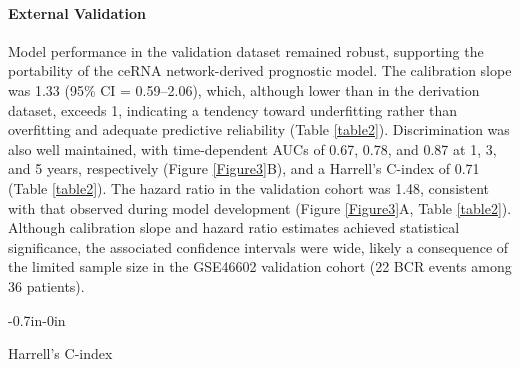 \paragraph{External Validation}
Model performance in the validation dataset remained robust, supporting the portability of the ceRNA network-derived prognostic model. The calibration slope was 1.33 (95\% CI = 0.59–2.06), which, although lower than in the derivation dataset, exceeds 1, indicating a tendency toward underfitting rather than overfitting and adequate predictive reliability (Table \ref{table2}). Discrimination was also well maintained, with time-dependent AUCs of 0.67, 0.78, and 0.87 at 1, 3, and 5 years, respectively (Figure \ref{Figure3}B), and a Harrell’s C-index of 0.71 (Table \ref{table2}). The hazard ratio in the validation cohort was 1.48, consistent with that observed during model development (Figure \ref{Figure3}A, Table \ref{table2}). Although calibration slope and hazard ratio estimates achieved statistical significance, the associated confidence intervals were wide, likely a consequence of the limited sample size in the GSE46602 validation cohort (22 BCR events among 36 patients).


\begin{table}[ht!]
\caption[Evaluation of the prognostic model in the derivation dataset and external validation dataset]{\textbf{Evaluation of the prognostic model in the derivation dataset and external validation dataset}.\label{table2}}
\begin{adjustwidth}{-0.7in}{-0in}
\tabcolsep=0pt%
\footnotesize
{}
\end{adjustwidth}
\begin{tablenotes}
\item[$^{1}$] Harrell's C-index
\end{tablenotes}
\end{table}


